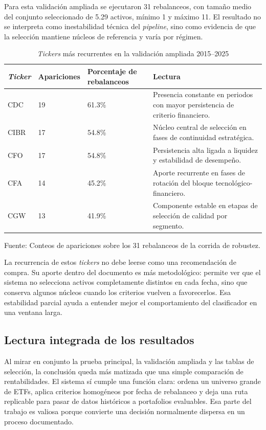 \documentclass[12pt,letterpaper]{article}
\newcommand{\fuente}[1]{\begin{center}\small Fuente: #1\end{center}}
\begin{document}
Para esta validación ampliada se ejecutaron 31 rebalanceos, con tamaño medio del conjunto seleccionado de 5.29 activos, mínimo 1 y máximo 11. El resultado no se interpreta como inestabilidad técnica del \textit{pipeline}, sino como evidencia de que la selección mantiene núcleos de referencia y varía por régimen.

\begin{table}[H]
\centering
\caption{\textit{Tickers} más recurrentes en la validación ampliada 2015--2025}
\label{tab:recurrentes_ampliada}
\begin{tabular}{p{1.8cm}p{2.2cm}p{3.2cm}p{4.8cm}}
\toprule
\textbf{\textit{Ticker}} & \textbf{Apariciones} & \textbf{Porcentaje de rebalanceos} & \textbf{Lectura} \\
\midrule
CDC & 19 & 61.3\% & Presencia constante en periodos con mayor persistencia de criterio financiero. \\
CIBR & 17 & 54.8\% & Núcleo central de selección en fases de continuidad estratégica. \\
CFO & 17 & 54.8\% & Persistencia alta ligada a liquidez y estabilidad de desempeño. \\
CFA & 14 & 45.2\% & Aporte recurrente en fases de rotación del bloque tecnológico-financiero. \\
CGW & 13 & 41.9\% & Componente estable en etapas de selección de calidad por segmento. \\
\bottomrule
\end{tabular}
\end{table}
\fuente{Conteos de apariciones sobre los 31 rebalanceos de la corrida de robustez.}

La recurrencia de estos \textit{tickers} no debe leerse como una recomendación de compra. Su aporte dentro del documento es más metodológico: permite ver que el sistema no selecciona activos completamente distintos en cada fecha, sino que conserva algunos núcleos cuando los criterios vuelven a favorecerlos. Esa estabilidad parcial ayuda a entender mejor el comportamiento del clasificador en una ventana larga.

\subsection{Lectura integrada de los resultados}

Al mirar en conjunto la prueba principal, la validación ampliada y las tablas de selección, la conclusión queda más matizada que una simple comparación de rentabilidades. El sistema sí cumple una función clara: ordena un universo grande de ETFs, aplica criterios homogéneos por fecha de rebalanceo y deja una ruta replicable para pasar de datos históricos a portafolios evaluables. Esa parte del trabajo es valiosa porque convierte una decisión normalmente dispersa en un proceso documentado.
\end{document}
